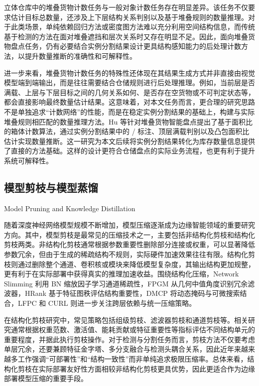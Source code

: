 立体仓库中的堆叠货物计数任务与一般对象计数任务存在明显差异。该任务不仅要求估计目标总数量，还涉及上下层结构关系判别以及基于堆叠规则的数量推理。对于此类场景，单纯依赖回归方法或密度图方法难以充分利用空间结构信息，而传统基于检测的方法在面对堆叠遮挡和层次关系时又存在明显不足。因此，面向堆叠货物盘点任务，仍有必要结合实例分割结果设计更具结构感知能力的后处理计数方法，以提升数量推断的准确性和可解释性。

进一步来看，堆叠货物计数任务的特殊性还体现在其结果生成方式并非直接由视觉模型端到端输出，而是往往需要结合仓储规则进行后处理推理。例如，当前层是否满载、上层与下层目标之间的几何关系如何、是否存在空货物或不可判定状态等，都会直接影响最终数量估计结果。这意味着，对本文任务而言，更合理的研究思路不是单独追求“计数网络”的性能，而是在稳定实例分割结果的基础上，构建与实际堆叠规则相匹配的数量推理方法。Hu 等针对堆叠货物智能盘点提出了基于面积比的箱体计数算法，通过实例分割结果中的 / 标注、顶层满载判别以及凸包面积比估计实现数量推断\cite{hu2025area}。这一研究为本文后续将实例分割结果转化为库存数量信息提供了直接的方法基础。这样的设计更符合仓储盘点的实际业务流程，也更有利于提升系统可解释性。

\subsection{模型剪枝与模型蒸馏}{Model Pruning and Knowledge Distillation}

随着深度神经网络模型规模不断增加，模型压缩逐渐成为边缘智能领域的重要研究方向\cite{han2016deepcompression,hinton2015distilling}。其中，模型剪枝是最常见的压缩技术之一，主要包括非结构化剪枝和结构化剪枝两类。非结构化剪枝通常根据参数重要性删除部分连接或权重，可以显著降低参数冗余\cite{han2015learning}，但由于生成的稀疏结构不规则，实际硬件加速效果往往有限。结构化剪枝则通过删除整个通道、卷积核或模块来降低模型复杂度，其输出结构更加规整，更有利于在实际部署中获得真实的推理加速收益\cite{luo2017thinet,he2017channelpruning}。围绕结构化压缩，Network Slimming 利用 BN 缩放因子学习通道稀疏性，FPGM 从几何中值角度识别冗余滤波器，HRank 基于特征图秩评估结构重要性，DMCP 将动态掩码与可微搜索结合，LFPC 和 CURL 则进一步关注跨层依赖与统一压缩策略\cite{liu2017networkslimming,he2019fpgm,lin2020hrank,guo2020dmcp,he2020lfpc,luo2020curl}。

在结构化剪枝研究中，常见策略包括组级剪枝、滤波器剪枝和通道剪枝等。相关研究通常根据权重范数、激活值、能耗贡献或特征重要性等指标评估不同结构单元的重要程度，并据此执行剪枝操作\cite{luo2017thinet,he2017channelpruning}。对于检测与分割任务而言，剪枝方法不仅要考虑单层冗余，还要兼顾特征金字塔、多分支融合与检测头耦合关系，因此近年来越来越多工作强调“可部署性”和“结构一致性”而非单纯追求极限压缩率\cite{liu2017networkslimming,guo2020dmcp,luo2020curl}。总体来看，结构化剪枝在实际部署友好性方面相较非结构化剪枝更具优势，因此更适合作为边缘部署模型压缩的重要手段。

